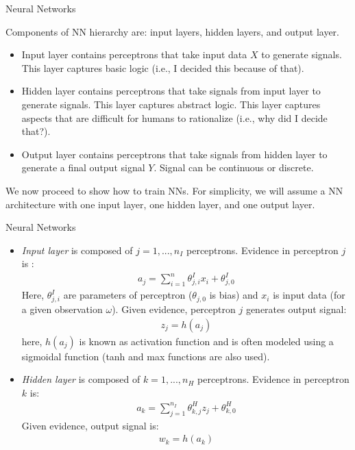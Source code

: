\documentclass[9pt]{beamer}
\begin{document}
\begin{frame}{Neural Networks}

Components of NN hierarchy are: input layers,  hidden layers, and output layer.
\begin{block}{}
\begin{itemize}
\item Input layer contains perceptrons that take input data $X$ to generate signals. This layer captures basic logic (i.e., I decided  this because of that). 
\item Hidden layer contains perceptrons that take signals from input layer to generate signals. This layer captures abstract logic. This layer captures aspects that are difficult for humans to rationalize (i.e., why did I decide that?). 
\item Output layer contains perceptrons that take signals from hidden layer to generate a final output signal $Y$. Signal can be continuous or discrete. 
\end{itemize}
\end{block}
We now proceed to show how to train NNs. For simplicity, we will assume a NN architecture with one input layer, one hidden layer, and one output layer. 

\end{frame}


\begin{frame}{Neural Networks}

\begin{itemize}
\item {\em Input layer} is composed of $j=1,...,n_I$ perceptrons. Evidence in perceptron $j$ is :
\begin{align*}
a_j=\sum_{i=1}^n\theta_{j,i}^{I}x_i+\theta_{j,0}^I
\end{align*}
Here, $\theta_{j,i}^I$ are parameters of perceptron ($\theta_{j,0}$ is bias) and $x_i$ is input data (for a given observation $\omega$).  Given evidence, perceptron $j$ generates output signal:
\begin{align*}
z_j=h(a_j)
\end{align*}
here, $h(a_j)$ is known as activation function and is often modeled using a sigmoidal function (tanh and max functions are also used). 
\item {\em Hidden layer} is composed of $k=1,...,n_H$ perceptrons. Evidence in perceptron $k$ is:
\begin{align*}
a_k=\sum_{j=1}^{n_I}\theta_{k,j}^{H}z_j+\theta_{k,0}^H
\end{align*}
Given evidence, output signal is:
\begin{align*}
w_k=h(a_k)
\end{align*}

\end{itemize}

\end{frame}
\end{document}
